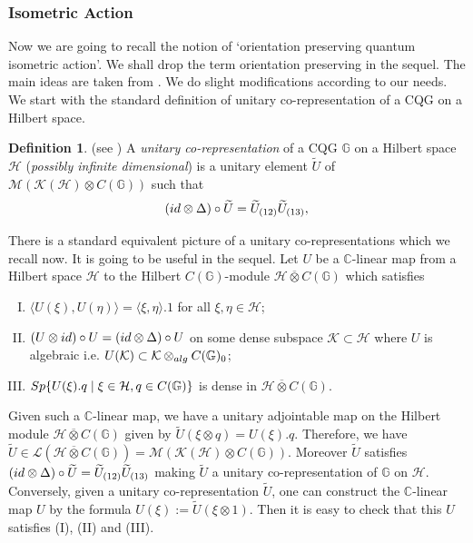\documentclass{amsart}
\theoremstyle{plain}
\theoremstyle{definition}
\newtheorem{definition}[subsection]{Definition}
\theoremstyle{remark}
\numberwithin{equation}{section}
\newcommand{\Dlt}{\Delta}
\newcommand{\cal}{\mathcal}
\newcommand{\clh}{{\cal H}}
\newcommand{\clk}{{\cal K}}
\newcommand{\cll}{{\cal L}}
\begin{document}
\subsubsection{Isometric Action}
Now we are going to recall the notion of `orientation preserving quantum isometric action'. We shall drop the term orientation preserving in the sequel. The main ideas are taken from \cite{goswami1}. We do slight modifications according to our needs. We start with the standard definition of unitary co-representation of a CQG on a Hilbert space.
\begin{definition}(see \cites{vandaele,neshveyevrepcategory})
\label{Unitary representation definition}
    A \textit{unitary co-representation} of a CQG $\mathbb{G}$ on a Hilbert space $\mathcal{H}$ (\textit{possibly infinite dimensional}) is a unitary element $\widetilde{U}$ of $\mathcal{M}(\mathcal{K}(\mathcal{H})\otimes C(\mathbb{G}))$
such that 
\begin{displaymath}({\rm id}\otimes \Dlt)\circ\widetilde{U}=\widetilde{U}_{(12)}\widetilde{U}_{(13)},\end{displaymath}
\end{definition}
There is a standard equivalent picture of a unitary co-representations which we recall now. It is going to be useful in the sequel. Let $U$ be a $\mathbb{C}$-linear map from a Hilbert space $\mathcal{H}$ to the Hilbert $C(\mathbb{G})$-module $\mathcal{H}\overline{\otimes} C(\mathbb{G})$ which satisfies
\begin{enumerate}[(I)]
\setlength\itemsep{0.5em}
    \item $\langle U(\xi), U(\eta) \rangle=\langle \xi,\eta \rangle.1$ for all $\xi,\eta\in\clh$;
    \item $(U\otimes \rm{id})\circ U=({\rm id}\otimes \Dlt)\circ U$ on some dense subspace $\clk\subset\clh$ where $U$ is algebraic i.e. $U(\clk)\subset\clk\otimes_{\rm alg}C(\mathbb{G})_{0}$;
    \item ${\rm Sp}\{U(\xi).q\;|\; \xi\in \mathcal{H}, q\in C(\mathbb{G})\}$ is dense in $\mathcal{H}\overline{\otimes} C(\mathbb{G})$.
\end{enumerate}
Given such a $\mathbb{C}$-linear map, we have a unitary adjointable map on the Hilbert module $\mathcal{H}\overline{\otimes}C(\mathbb{G})$ given by $\widetilde{U}(\xi\otimes q)=U(\xi).q$. Therefore, we have $\widetilde{U}\in \cll(\mathcal{H}\overline{\otimes}C(\mathbb{G}))=\mathcal{M}(\mathcal{K}(\mathcal{H})\otimes C(\mathbb{G}))$. Moreover $\widetilde{U}$ satisfies $({\rm id}\otimes \Dlt)\circ\widetilde{U}=\widetilde{U}_{(12)}\widetilde{U}_{(13)}$ making $\widetilde{U}$ a unitary co-representation of $\mathbb{G}$ on $\clh$. Conversely, given a unitary co-representation $\widetilde{U}$, one can construct the $\mathbb{C}$-linear map $U$ by the formula $U(\xi):=\widetilde{U}(\xi\otimes 1)$. Then it is easy to check that this $U$ satisfies (I), (II) and (III).\\
\end{document}

